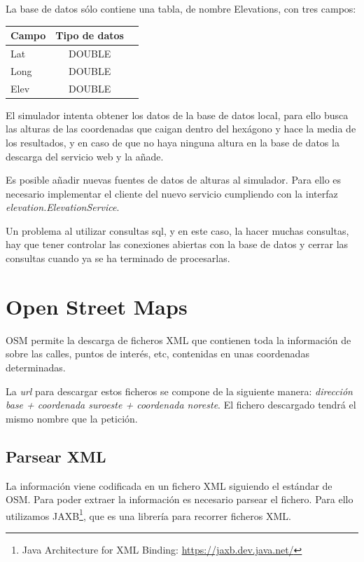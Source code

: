 La base de datos sólo contiene una tabla, de nombre Elevations, con tres campos:

\begin{center}
\begin{tabular}{ | l | c | r | }
\hline
{\bf Campo} & {\bf Tipo de datos} \\ \hline
Lat & DOUBLE \\ \hline
Long & DOUBLE \\ \hline
Elev & DOUBLE \\ \hline
\end{tabular}
\end{center}

El simulador intenta obtener los datos de la base de datos local, para ello
busca las alturas de las coordenadas que caigan dentro del hexágono y hace la
media de los resultados, y en caso de que no haya ninguna altura en la base de
datos la descarga del servicio web y la añade.

Es posible añadir nuevas fuentes de datos de alturas al simulador. Para ello es
necesario implementar el cliente del nuevo servicio cumpliendo con la interfaz
{\em elevation.ElevationService}.

Un problema al utilizar consultas sql, y en este caso, la hacer muchas
consultas, hay que tener controlar las conexiones abiertas con la base de datos
y cerrar las consultas cuando ya se ha terminado de procesarlas.

\section{Open Street Maps}

OSM permite la descarga de ficheros XML que contienen toda la información de
sobre las calles, puntos de interés, etc, contenidas en unas coordenadas
determinadas.

La {\em url} para descargar estos ficheros se compone de la siguiente manera: 
{\em dirección base + coordenada suroeste + coordenada noreste}. El fichero
descargado tendrá el mismo nombre que la petición.

\subsection{Parsear XML}

La información viene codificada en un fichero XML siguiendo el estándar de OSM.
Para poder extraer la información es necesario parsear el fichero. Para ello
utilizamos JAXB\footnote{Java Architecture for XML Binding: 
\url{https://jaxb.dev.java.net/}}, que es una librería para recorrer ficheros
XML. 

